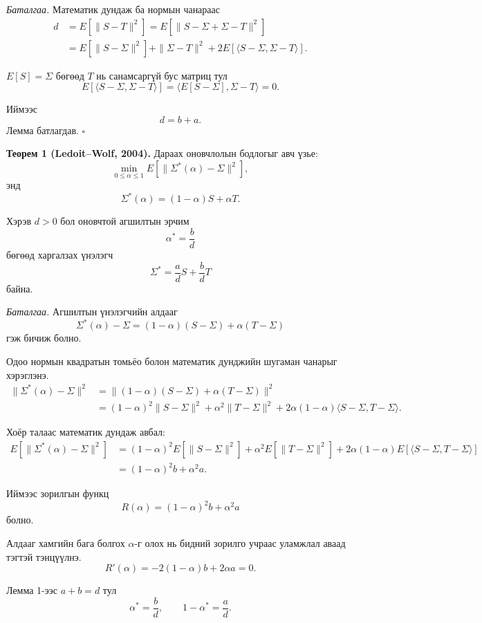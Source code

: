 \medskip
\noindent
\textit{Баталгаа.}
Математик дундаж ба нормын чанараас
\[
\begin{aligned}
	d
	&=E\left[\|S-T\|^2\right]=E\left[\|S-\Sigma+\Sigma-T\|^2\right]\\
	&=E\left[\|S-\Sigma\|^2\right]
	+\|\Sigma-T\|^2+
	2E\left[
	\langle S-\Sigma,\Sigma-T\rangle
	\right].
\end{aligned}
\]

$E[S]=\Sigma$ бөгөөд $T$ нь
санамсаргүй бус матриц тул
\[
E\left[
\langle S-\Sigma,\Sigma-T\rangle
\right]
=
\langle E[S-\Sigma],\Sigma-T\rangle
=0.
\]

Иймээс
\[
d=b+a.
\]
Лемма батлагдав. \hfill $\square$

\medskip
\noindent
\textbf{Теорем 1 (Ledoit--Wolf, 2004).}
Дараах оновчлолын бодлогыг авч үзье:
\[
\min_{0\leq\alpha\leq1}
E\left[
\|\Sigma^*(\alpha)-\Sigma\|^2
\right],
\]
энд
\[
\Sigma^*(\alpha)
=
(1-\alpha)S+\alpha T.
\]

Хэрэв $d>0$ бол оновчтой
агшилтын эрчим
\[
\alpha^*=\frac{b}{d}
\]
бөгөөд харгалзах үнэлэгч
\[
\Sigma^*
=
\frac{a}{d}S
+
\frac{b}{d}T
\]
байна.

\medskip
\noindent
\textit{Баталгаа.}
Агшилтын үнэлэгчийн алдааг
\[
\Sigma^*(\alpha)-\Sigma
=
(1-\alpha)(S-\Sigma)
+\alpha(T-\Sigma)
\]
гэж бичиж болно.

Одоо нормын квадратын томьёо болон математик дунджийн шугаман чанарыг хэрэглэнэ.
\[
\begin{aligned}
	\|\Sigma^*(\alpha)-\Sigma\|^2&=\|(1-\alpha)(S-\Sigma)
	+\alpha(T-\Sigma)\|^2\\
	&=(1-\alpha)^2\|S-\Sigma\|^2+\alpha^2\|T-\Sigma\|^2+2\alpha(1-\alpha)
	\langle S-\Sigma,T-\Sigma\rangle.
\end{aligned}
\]

Хоёр талаас математик дундаж авбал:
\[
\begin{aligned}
	E\left[\|\Sigma^*(\alpha)-\Sigma\|^2\right]&=(1-\alpha)^2E\left[\|S-\Sigma\|^2\right]+\alpha^2E\left[\|T-\Sigma\|^2\right]+2\alpha(1-\alpha)E\left[\langle S-\Sigma,T-\Sigma\rangle\right]\\
	&=
	(1-\alpha)^2b+\alpha^2a.
\end{aligned}
\]

Иймээс зорилгын функц
\[
R(\alpha)
=
(1-\alpha)^2b+\alpha^2a
\]
болно.

Алдааг хамгийн бага болгох \(\alpha\)-г олох нь бидний зорилго учраас уламжлал аваад тэгтэй тэнцүүлнэ.
\[
R'(\alpha)
=
-2(1-\alpha)b+2\alpha a=0.
\]

Лемма 1-ээс $a+b=d$ тул
\[
\alpha^*=\frac{b}{d}, \qquad 
1-\alpha^*=\frac{a}{d}.
\]

